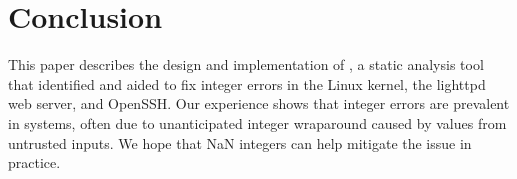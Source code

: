 \section{Conclusion}
\label{s:concl}

This paper describes the design and implementation of \sys, a static
analysis tool that identified and aided to fix \nrbugs integer
errors in the Linux kernel, the lighttpd web server, and OpenSSH\@.
Our experience shows that integer errors are prevalent in systems,
often due to unanticipated integer wraparound caused by values from
untrusted inputs.  We hope that NaN integers can help mitigate the
issue in practice.

